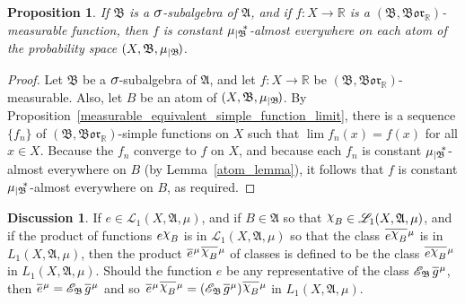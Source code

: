 \documentclass[
twoside=true,
paper=letter,
fontsize=11pt,
pagesize=auto,
leqno,
openany,
headsepline,
overfullrule,
]{scrbook}
\theoremstyle{plain}
\theoremstyle{plain}
\newtheorem{prop}[thm]{Proposition}
\theoremstyle{definition}
\newtheorem{discussion}[thm]{Discussion}
\theoremstyle{bfnoteitalic}
\theoremstyle{bfnoteroman}
\newcommand{\sigalg}[1]{\mathfrak{#1}}
\newcommand{\cali}[1]{\mathscr{#1}}
\newcommand{\condexpsub}[2]
{\mathop{\cali{E}\hspace{-1.5pt}}\nolimits_{#2}\hspace{-1pt}#1}
\newcommand{\borel}{\mathfrak{Bor}}
\newcommand{\textsigma}{\hbox{\large{$\sigma$}}\kern-1pt}
\newcommand{\charfunction}[1]{{\raisebox{2pt}{$\chi$}}_{#1}}
\newcommand{\restrictedto}[1]{_{\lvert#1}\kern-1.5pt}
\newcommand{\R}{\mathbb{R}}
\newcommand{\sigmaalgebra}{\sigalg{A}}
\newcommand{\sigmaalgebraii}{\sigalg{B}}
\newcommand{\Psubstar}[1]{\measure\restrictedto{#1}\kern-2pt^*}
\newcommand{\sigalgb}{\sigmaalgebraii}
\newcommand{\function}{f}
\newcommand{\functionii}{g}
\newcommand{\measurespace}{X}
\newcommand{\mspaceelt}{x}
\newcommand{\measure}{\mu}
\newcommand*\xbar[1]{%
   \hbox{%
     \vbox{%
       \hrule height 0.4pt %
       \kern0.4ex%
       \hbox{%
         \ensuremath{#1}%
       }%
     }%
   }%
}
\newcommand{\lebclass}[1]{\hspace{.5pt}\xbar{#1}\hspace{0.5pt}}
\newcommand{\ellclass}[2]{\lebclass{#1}^{#2}}
\begin{document}
\begin{prop}\label{constant_on_the_atoms}
If $\sigmaalgebraii$ is a $\textsigma$-subalgebra of $\sigmaalgebra$, and if  $\function:\measurespace\to\R$ is a $(\sigmaalgebraii, \borel_\R)$\hyp{}measurable function, then $\function$ is constant $\Psubstar{\sigalgb}$-almost everywhere on each atom of 
the probability space
$(\measurespace, \sigmaalgebraii,\measure\restrictedto{\sigmaalgebraii})$. 
\end{prop}

\begin{proof}
Let $\sigmaalgebraii$ be a $\textsigma$-subalgebra of $\sigmaalgebra$, and let $\function:\measurespace\to\R$ be $(\sigmaalgebraii, \borel_\R)$\hyp{}measurable. Also, let $B$ be an atom of $(\measurespace, \sigmaalgebraii,\measure\restrictedto{\sigmaalgebraii})$.  By Proposition~\ref{measurable_equivalent_simple_function_limit}, there is a sequence $\{\function_n\}$ of $(\sigmaalgebraii, \borel_\R)$-simple functions on $\measurespace$ such that 
$\lim  \function_n(\mspaceelt) = \function(\mspaceelt)$ for all $\mspaceelt\in\measurespace$. Because the $\function_n$ converge to $\function$ on $\measurespace$, and because  each $\function_n$ is constant $\Psubstar{\sigalgb}$-almost everywhere on $B$ (by Lemma~\ref{atom_lemma}), it follows that $\function$ is constant $\Psubstar{\sigalgb}$-almost everywhere on $B$, as required.
\end{proof}



\begin{discussion}
If $e\in\cali{L}_1(\measurespace, \sigmaalgebra,\measure)$, and if $B\in\sigmaalgebra$ so that $\charfunction{B}\in\cali{L}_1(\measurespace, \sigmaalgebra,\measure)$, and if the product of functions
$e\charfunction{B}$ is in $\cali{L}_1(\measurespace, \sigmaalgebra,\measure)$
so that the class $\ellclass{e\charfunction{B}}{\measure}$ is in 
$L_1(\measurespace, \sigmaalgebra,\measure)$, then the product 
$\ellclass{e}{\measure}\ellclass{\charfunction{B}}{\measure}$ 
of classes is defined to be the class 
$\ellclass{e\charfunction{B}}{\measure}$ in 
$L_1(\measurespace, \sigmaalgebra,\measure)$.
Should the function $e$ be any representative of the class 
$\condexpsub{\ellclass{\functionii}{\measure}}{\sigmaalgebraii}$, 
then $\ellclass{e}{\measure} = \condexpsub{\ellclass{\functionii}{\measure}}{\sigmaalgebraii}$
and so  
$\ellclass{e}{\measure}\ellclass{\charfunction{B}}{\measure} 
=
(\condexpsub{\ellclass{\functionii}{\measure}}{\sigmaalgebraii})\ellclass{\charfunction{B}}{\measure}$ 
in $L_1(\measurespace, \sigmaalgebra,\measure)$.
\end{discussion}
\end{document}
